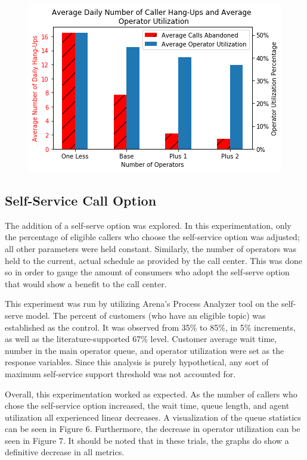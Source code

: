 \documentclass[12pt]{article}
\begin{document}
	\begin{figure}[h]
		\includegraphics[scale=.5]{num_ops_plot.png}
		\caption{}
	\end{figure}
	
	
	\subsection{Self-Service Call Option}

	The addition of a self-serve option was explored.  In this experimentation, only the percentage of eligible callers who choose the self-service option was adjusted; all other parameters were held constant.  Similarly, the number of operators was held to the current, actual schedule as provided by the call center.  This was done so in order to gauge the amount of consumers who adopt the self-serve option that would show a benefit to the call center.
	
	\par
	
	This experiment was run by utilizing Arena's Process Analyzer tool on the self-serve model.  The percent of customers (who have an eligible topic) was established as the control.  It was observed from 35\% to 85\%, in 5\% increments, as well as the literature-supported 67\% level.  Customer average wait time, number in the main operator queue, and operator utilization were set as the response variables.  Since this analysis is purely hypothetical, any sort of maximum self-service support threshold was not accounted for.
	
	\par
	
	Overall, this experimentation worked as expected.  As the number of callers who chose the self-service option increased, the wait time, queue length, and agent utilization all experienced linear decreases.  A visualization of the queue statistics can be seen in Figure 6.  Furthermore, the decrease in operator utilization can be seen in Figure 7.  It should be noted that in these trials, the graphs do show a definitive decrease in all metrics.
	
\end{document}
